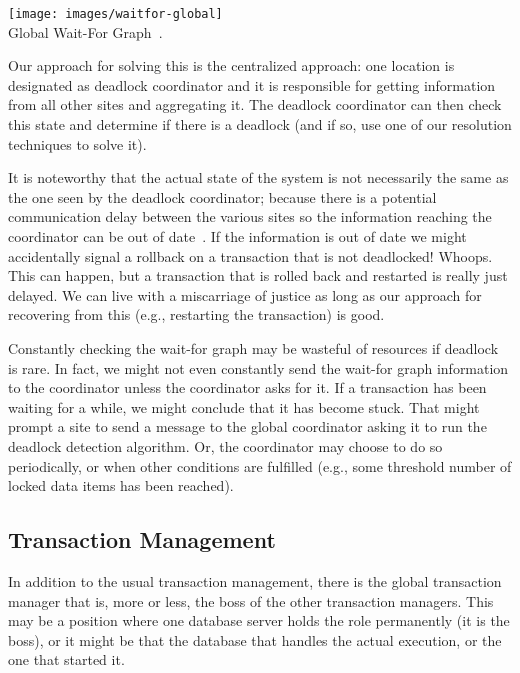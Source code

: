 \begin{center}
\texttt{[image: images/waitfor-global]}\\
Global Wait-For Graph~\cite{dsc}.
\end{center}

Our approach for solving this is the centralized approach: one location is designated as deadlock coordinator and it is responsible for getting information from all other sites and aggregating it. The deadlock coordinator can then check this state and determine if there is a deadlock (and if so, use one of our resolution techniques to solve it).

It is noteworthy that the actual state of the system is not necessarily the same as the one seen by the deadlock coordinator; because there is a potential communication delay between the various sites so the information reaching the coordinator can be out of date~\cite{dsc}. If the information is out of date we might accidentally signal a rollback on a transaction that is not deadlocked! Whoops. This can happen, but a transaction that is rolled back and restarted is really just delayed. We can live with a miscarriage of justice as long as our approach for recovering from this (e.g., restarting the transaction) is good.

Constantly checking the wait-for graph may be wasteful of resources if deadlock is rare. In fact, we might not even constantly send the wait-for graph information to the coordinator unless the coordinator asks for it. If a transaction has been waiting for a while, we might conclude that it has become stuck. That might prompt a site to send a message to the global coordinator asking it to run the deadlock detection algorithm. Or, the coordinator may choose to do so periodically, or when other conditions are fulfilled (e.g., some threshold number of locked data items has been reached). 

\subsection*{Transaction Management}

In addition to the usual transaction management, there is the global transaction manager that is, more or less, the boss of the other transaction managers. This may be a position where one database server holds the role permanently (it is the boss), or it might be that the database that handles the actual execution, or the one that started it.

